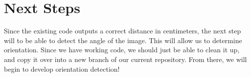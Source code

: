 \documentclass{article}
\begin{document}
	\section{Next Steps}
	Since the existing code outputs a correct distance in centimeters, the next step will to be able to detect the angle of the image. This will allow us to determine orientation. Since we have working code, we should just be able to clean it up, and copy it over into a new branch of our current repository. From there, we will begin to develop orientation detection!
	
\end{document}
